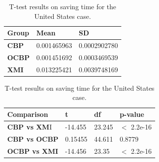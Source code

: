 \documentclass{llncs}
\begin{document}
\begin{table}[ht]
    \centering
    \label{table:ttest_save_time_wikipedia}
    \caption{T-test results on saving time for the United States case.}
    \begin{minipage}{0.44\textwidth}
        \centering
        \begin{tabular}{|p{}|p{}|p{}|}
            \hline 
            \textbf{Group}  & \textbf{Mean} & \textbf{SD} \\ 
            \hline 
            \textbf{CBP} & 0.001465963     &0.0002902780 \\ 
            \hline 
            \textbf{OCBP} & 0.001451692  &  0.0003469539 \\ 
            \hline 
            \textbf{XMI} & 0.013225421  & 0.0039748169 \\ 
            \hline 
        \end{tabular} 
    \end{minipage}
    \hfill
    \begin{minipage}{0.54\textwidth}
        \centering
        \begin{tabular}{|p{}|p{}|p{}|p{}|}
            \hline 
            \textbf{Comparison} & \textbf{t}  & \textbf{df} & \textbf{p-value} \\ 
            \hline 
            \textbf{CBP vs XM}I &-14.455   & 23.245 & $<$ 2.2e-16 \\ 
            \hline 
            \textbf{CBP vs OCBP} &   0.15455 & 44.611 & 0.8779 \\ 
            \hline 
            \textbf{OCBP vs XMI} & -14.456   & 23.35 & $<$ 2.2e-16 \\ 
            \hline 
        \end{tabular} 
    \end{minipage}
\end{table}
\end{document}
